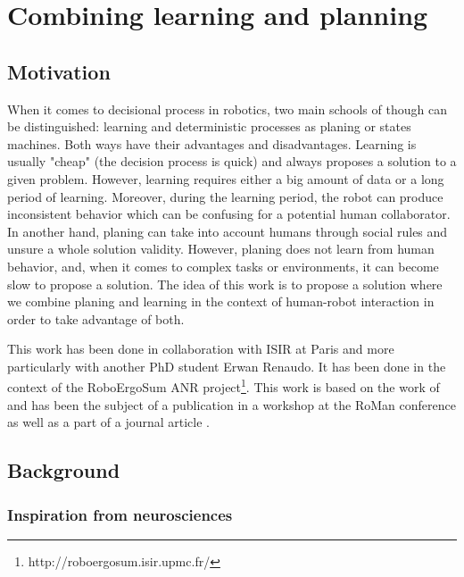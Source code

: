 \documentclass[english,a4paper,11pt,twoside]{StyleThese}
\begin{document}
\setcounter{chapter}{6} %
\dominitoc
\faketableofcontents
\fi

\chapter{Combining learning and planning}
\minitoc

\section{Motivation}

When it comes to decisional process in robotics, two main schools of though can be distinguished: learning and deterministic processes as planing or states machines. Both ways have their advantages and disadvantages. Learning is usually "cheap" (the decision process is quick) and always proposes a solution to a given problem. However, learning requires either a big amount of data or a long period of learning. Moreover, during the learning period, the robot can produce inconsistent behavior which can be confusing for a potential human collaborator. In another hand, planing can take into account humans through social rules and unsure a whole solution validity. However, planing does not learn from human behavior, and, when it comes to complex tasks or environments, it can become slow to propose a solution. The idea of this work is to propose a solution where we combine planing and learning in the context of human-robot interaction in order to take advantage of both. 

This work has been done in collaboration with ISIR at Paris and more particularly with another PhD student Erwan Renaudo. It has been done in the context of the RoboErgoSum ANR project\footnote{http://roboergosum.isir.upmc.fr/}. This work is based on the work of \cite{renaudo2014design} and has been the subject of a publication in a workshop at the RoMan conference \cite{renaudo2015learning} as well as a part of a journal article \cite{khamassi2016integration}.

\section{Background}

\subsection{Inspiration from neurosciences}
\end{document}
